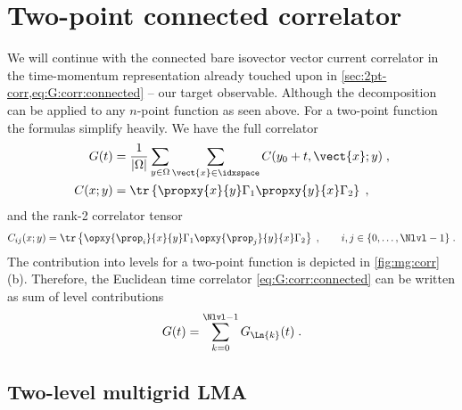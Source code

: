 \section{Two-point connected correlator}

We will continue with the connected bare isovector vector current correlator in the time-momentum representation already touched upon in \cref{sec:2pt-corr,eq:G:corr:connected} -- our target observable.
Although the decomposition can be applied to any $n$-point function as seen above.
For a two-point function the formulas simplify heavily.
We have the full correlator
\begin{align} \label{eq:2pt:G}
G(t) &= \frac{1}{\lvert \Omega \rvert} \sum_{y \in \Omega} \sum_{\vect{x} \in \idxspace} C(y_0+t, \vect{x} ; y) \;,
\\
C(x; y) &= \tr \left\{ \propxy{x}{y} \Gamma_1 \propxy{y}{x} \Gamma_2 \right\} \;,
\end{align}
and the rank-2 correlator tensor
\begin{equation} \label{eq:Cij}
C_{ij}(x; y) = \tr \left\{ \opxy{\prop_{i}}{x}{y} \Gamma_1 \opxy{\prop_{j}}{y}{x} \Gamma_2 \right\} \;,
\qquad i,j \in \{0, \ldots, \Nlvl-1\} \;.
\end{equation}
The contribution into levels for a two-point function is depicted in \cref{fig:mg:corr} (b).
Therefore, the Euclidean time correlator \cref{eq:G:corr:connected} can be written as sum of level contributions
\begin{align}
G(t) = \sum_{k=0}^{\Nlvl-1} G_{\Ln{k}}(t) \;.
\end{align}

\subsection{Two-level multigrid LMA}

